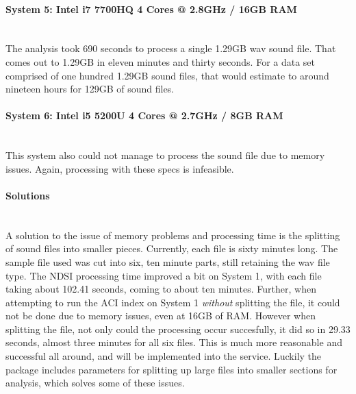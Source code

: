 \paragraph{System 5: Intel i7 7700HQ 4 Cores @ 2.8GHz / 16GB RAM} \mbox{}\\[\paragraphheaderspace]
The analysis took 690 seconds to process a single 1.29GB wav sound file. That comes out to 1.29GB in eleven minutes and thirty seconds. For a data set comprised of one hundred 1.29GB sound files, that would estimate to around nineteen hours for 129GB of sound files.

\paragraph{System 6: Intel i5 5200U 4 Cores @ 2.7GHz / 8GB RAM} \mbox{}\\[\paragraphheaderspace]
This system also could not manage to process the sound file due to memory issues. Again, processing with these specs is infeasible.

\paragraph{Solutions} \mbox{}\\[\paragraphheaderspace]
A solution to the issue of memory problems and processing time is the splitting of sound files into smaller pieces. Currently, each file is sixty minutes long. The sample file used was cut into six, ten minute parts, still retaining the wav file type. The NDSI processing time improved a bit on System 1, with each file taking  about 102.41 seconds, coming to about ten minutes. Further, when attempting to run the ACI index on System 1 \textit{without} splitting the file, it could not be done due to memory issues, even at 16GB of RAM. However when splitting the file, not only could the processing occur succesfully, it did so in 29.33 seconds, almost three minutes for all six files. This is much more reasonable and successful all around, and will be implemented into the service. Luckily the  package includes parameters for splitting up large files into smaller sections for analysis, which solves some of these issues.
